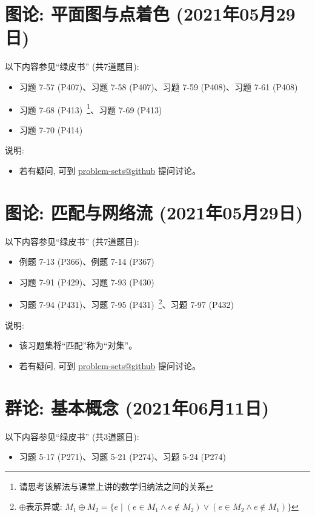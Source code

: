 \documentclass{article}
\begin{document}
\section{图论: 平面图与点着色 (2021年05月29日)}

以下内容参见``绿皮书'' (共7道题目):
\begin{itemize}
  \item 习题 7-57 (P407)、习题 7-58 (P407)、习题 7-59 (P408)、习题 7-61 (P408)
  \item 习题 7-68 (P413)~\footnote{请思考该解法与课堂上讲的数学归纳法之间的关系}、习题 7-69 (P413)
  \item 习题 7-70 (P414)
\end{itemize}

说明:
\begin{itemize}
  \item 若有疑问, 可到 \href{https://github.com/courses-at-nju-by-hfwei/discrete-math-problem-sets/discussions}{problem-sets@github} 提问讨论。
\end{itemize}
\section{图论: 匹配与网络流 (2021年05月29日)}

以下内容参见``绿皮书'' (共7道题目):
\begin{itemize}
  \item 例题 7-13 (P366)、例题 7-14 (P367)
  \item 习题 7-91 (P429)、习题 7-93 (P430)
  \item 习题 7-94 (P431)、习题 7-95 (P431)~\footnote{$\oplus$表示异或:
    $M_{1} \oplus M_{2} = \{e \mid (e \in M_{1} \land e \notin M_{2})
      \lor (e \in M_{2} \land e \notin M_{1})\}$}、习题 7-97 (P432)
\end{itemize}

说明:
\begin{itemize}
  \item 该习题集将``匹配''称为``对集''。
  \item 若有疑问, 可到 \href{https://github.com/courses-at-nju-by-hfwei/discrete-math-problem-sets/discussions}{problem-sets@github} 提问讨论。
\end{itemize}
\section{群论: 基本概念 (2021年06月11日)}

以下内容参见``绿皮书'' (共3道题目):
\begin{itemize}
  \item 习题 5-17 (P271)、习题 5-21 (P274)、习题 5-24 (P274)
\end{itemize}
\end{document}
